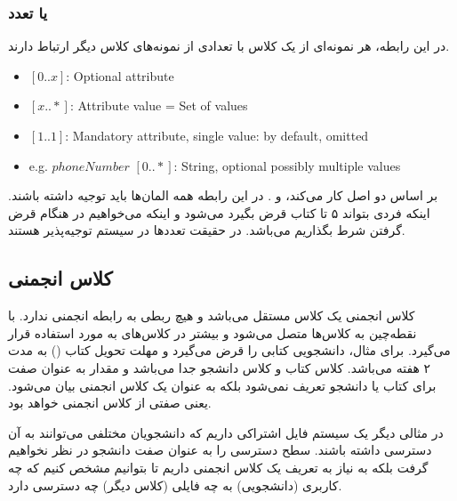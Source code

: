 \subsubsection{ یا تعدد}

در این رابطه، هر نمونه‌ای از یک کلاس با تعدادی از نمونه‌های کلاس دیگر ارتباط
دارند.

\begin{LTR}
    \begin{itemize}
        \item $[0..x]$: Optional attribute
        \item $[x..*]$: Attribute value = Set of values
        \item $[1..1]$: Mandatory attribute, single value: by default, omitted
        \item e.g. $phoneNumber$ $[0..*]$: String, optional possibly multiple
        values
    \end{itemize}
\end{LTR}

بر اساس دو اصل کار می‌کند،  و . در این رابطه
همه المان‌ها باید توجیه داشته باشند. اینکه فردی بتواند ۵ تا کتاب قرض بگیرد
می‌شود  و اینکه می‌خواهیم در هنگام قرض گرفتن شرط بگذاریم
 می‌باشد. در حقیقت تعدد‌ها در سیستم توجیه‌پذیر هستند.

\subsection{کلاس انجمنی}

کلاس انجمنی یک کلاس مستقل می‌باشد و هیچ ربطی به رابطه انجمنی ندارد. با نقطه‌چین
به کلاس‌ها متصل می‌شود و بیشتر در کلاس‌های  به  مورد استفاده قرار
می‌گیرد. برای مثال، دانشجویی کتابی را قرض می‌گیرد و مهلت تحویل کتاب () به مدت ۲ هفته می‌باشد. کلاس کتاب و کلاس دانشجو جدا می‌باشد و مقدار
 به عنوان صفت برای کتاب یا دانشجو تعریف نمی‌شود بلکه به عنوان
یک کلاس انجمنی بیان می‌شود. یعنی صفتی از کلاس انجمنی خواهد بود.

در مثالی دیگر یک سیستم فایل اشتراکی داریم که دانشجویان مختلفی می‌توانند به آن
دسترسی داشته باشند. سطح دسترسی را به عنوان صفت دانشجو در نظر نخواهیم گرفت بلکه
به نیاز به تعریف یک کلاس انجمنی داریم تا بتوانیم مشخص کنیم که چه کاربری
(دانشجویی) به چه فایلی (کلاس دیگر) چه دسترسی دارد.

\begin{LTR}


\end{LTR}

